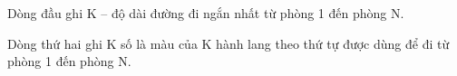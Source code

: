Dòng đầu ghi K – độ dài đường đi ngắn nhất từ phòng 1 đến phòng N.   


   Dòng thứ hai ghi K số là màu của K hành lang theo thứ tự được dùng để đi từ phòng 1 đến phòng N.